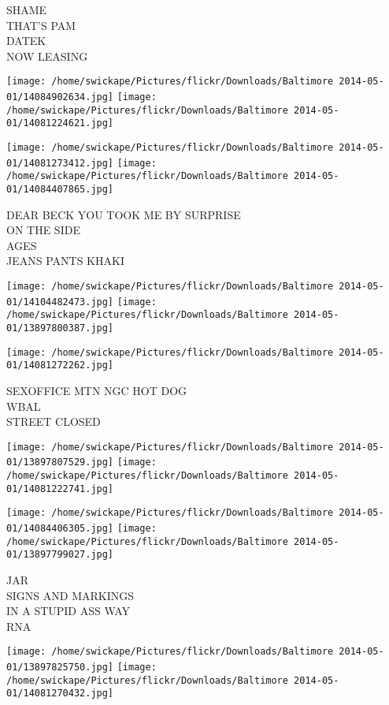 \documentclass[10pt,letterpaper]{article}
\begin{document}
SHAME\\
THAT'S PAM\\
DATEK\\
NOW LEASING
\pagebreak

\texttt{[image: /home/swickape/Pictures/flickr/Downloads/Baltimore 2014-05-01/14084902634.jpg]}
\texttt{[image: /home/swickape/Pictures/flickr/Downloads/Baltimore 2014-05-01/14081224621.jpg]}

\texttt{[image: /home/swickape/Pictures/flickr/Downloads/Baltimore 2014-05-01/14081273412.jpg]}
\texttt{[image: /home/swickape/Pictures/flickr/Downloads/Baltimore 2014-05-01/14084407865.jpg]}

DEAR BECK YOU TOOK ME BY SURPRISE\\
ON THE SIDE\\
AGES\\
JEANS PANTS KHAKI
\pagebreak

\texttt{[image: /home/swickape/Pictures/flickr/Downloads/Baltimore 2014-05-01/14104482473.jpg]}
\texttt{[image: /home/swickape/Pictures/flickr/Downloads/Baltimore 2014-05-01/13897800387.jpg]}

\vspace{0.25in}
\texttt{[image: /home/swickape/Pictures/flickr/Downloads/Baltimore 2014-05-01/14081272262.jpg]}

SEXOFFICE MTN NGC HOT DOG\\
WBAL\\
STREET CLOSED
\pagebreak

\texttt{[image: /home/swickape/Pictures/flickr/Downloads/Baltimore 2014-05-01/13897807529.jpg]}
\texttt{[image: /home/swickape/Pictures/flickr/Downloads/Baltimore 2014-05-01/14081222741.jpg]}

\texttt{[image: /home/swickape/Pictures/flickr/Downloads/Baltimore 2014-05-01/14084406305.jpg]}
\texttt{[image: /home/swickape/Pictures/flickr/Downloads/Baltimore 2014-05-01/13897799027.jpg]}

JAR\\
SIGNS AND MARKINGS\\
IN A STUPID ASS WAY\\
RNA
\pagebreak

\texttt{[image: /home/swickape/Pictures/flickr/Downloads/Baltimore 2014-05-01/13897825750.jpg]}
\texttt{[image: /home/swickape/Pictures/flickr/Downloads/Baltimore 2014-05-01/14081270432.jpg]}
\end{document}
